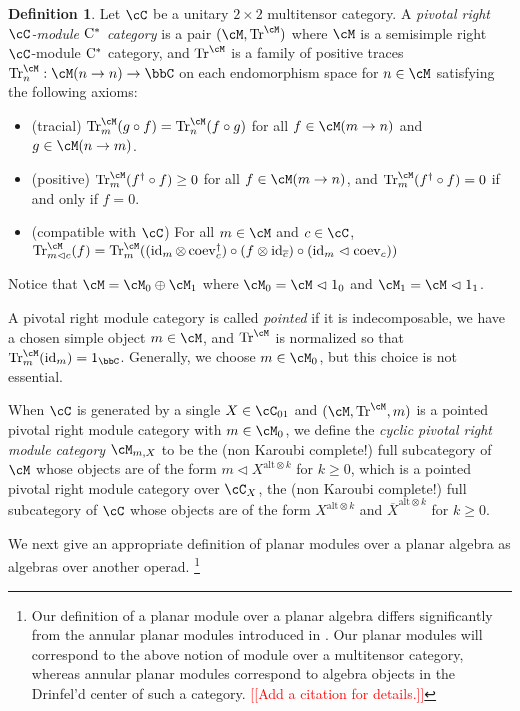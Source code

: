 \documentclass[11pt]{article}
\theoremstyle{plain}
\theoremstyle{definition}
\newtheorem{defn}[thm]{Definition}
\DeclareMathOperator{\coev}{coev}
\DeclareMathOperator{\id}{id}
\DeclareMathOperator{\Tr}{Tr}
\newcommand{\Cstar}{\rm{C^*}}
\newcommand{\nn}[1]{\textcolor{red}{[[#1]]}}
\begin{document}
\begin{defn}
Let $\cC$ be a unitary $2\times 2$ multitensor category.
A \emph{pivotal right $\cC$-module $\Cstar$ category} is a pair $(\cM,\Tr^\cM)$ where
$\cM$ is a semisimple right $\cC$-module $\Cstar$ category, and $\Tr^\cM$ is a family of positive traces $\Tr^\cM_n:\cM(n \to n)\to \bbC$ on each endomorphism space for $n\in \cM$ satisfying the following axioms:
\begin{itemize}
\item
(tracial)
$\Tr^\cM_m(g \circ f) = \Tr^\cM_n(f\circ g)$ for all $f\in \cM(m\to n)$ and $g\in \cM(n \to m)$.
\item
(positive)
$\Tr^\cM_m(f^\dag \circ f) \geq 0$ for all $f\in \cM(m \to n)$, and $\Tr^\cM_m(f^\dag \circ f) =0$ if and only if $f = 0$.
\item
(compatible with $\cC$)
For all $m\in \cM$ and $c\in \cC$,
$
\Tr^\cM_{m\vartriangleleft c}(f)
=
\Tr^\cM_{m}(
(\id_m \otimes \coev_c^\dag) \circ (f\otimes \id_{\overline{c}}) \circ (\id_m \vartriangleleft \coev_c)
)
$
\end{itemize}
Notice that $\cM = \cM_0 \oplus \cM_1$ where $\cM_0 = \cM \vartriangleleft 1_0$ and $\cM_1 = \cM\vartriangleleft 1_1$.

A pivotal right module category is called \emph{pointed} if it is indecomposable, we have a chosen simple object $m\in \cM$, and $\Tr^\cM$ is normalized so that $\Tr^\cM_m(\id_m) = 1_\bbC$.
Generally, we choose $m\in \cM_0$, but this choice is not essential.

When $\cC$ is generated by a single $X\in \cC_{01}$ and $(\cM,\Tr^\cM,m)$ is a pointed pivotal right module category with $m\in \cM_0$, we define the \emph{cyclic pivotal right module category} $\cM_{m,X}$ to be the (non Karoubi complete!) full subcategory of $\cM$ whose objects are of the form 
$
m \vartriangleleft X^{ \text{alt}\otimes k}
$ 
for $k\geq 0$, which is a pointed pivotal right module category over $\cC_X$, the (non Karoubi complete!) full subcategory of $\cC$ whose objects are of the form $X^{ \text{alt}\otimes k}$ and $\overline{X}^{ \text{alt}\otimes k}$ for $k\geq 0$.
\end{defn}


We next give an appropriate definition of planar modules over a planar algebra as algebras over another operad.
\footnote{Our definition of a planar module over a planar algebra differs significantly from the annular planar modules introduced in \cite{MR1929335}. Our planar modules will correspond to the above notion of module over a multitensor category, whereas annular planar modules correspond to algebra objects in the Drinfel'd center of such a category. \nn{Add a citation for details.}}
\end{document}

